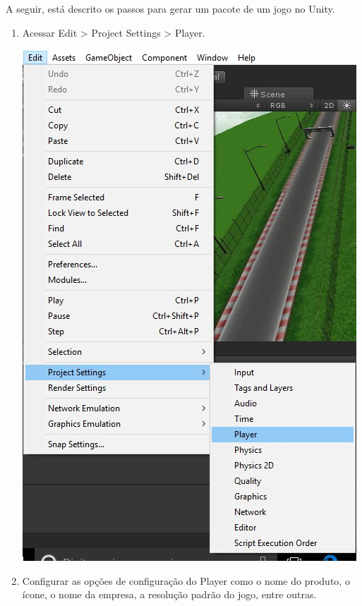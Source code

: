 A seguir, está descrito os passos para gerar um pacote de um jogo no Unity.

\begin{enumerate}
\item Acessar Edit > Project Settings > Player.

\begin{center}
	\includegraphics[scale=0.4]{figuras/playersettingspath}
\end{center}

\item Configurar as opções de configuração do Player como o nome do produto, o ícone, o nome da empresa, a resolução padrão do jogo, entre outras.


\end{enumerate}
